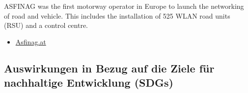 \documentclass[
]{book}
\providecommand{\tightlist}{%
  \setlength{\itemsep}{0pt}\setlength{\parskip}{0pt}}
\begin{document}
ASFINAG was the first motorway operator in Europe to launch the networking of road and vehicle. This includes the installation of 525 WLAN road units (RSU) and a control centre.

\begin{itemize}
\tightlist
\item
  \href{https://www.asfinag.at/ueber-uns/newsroom/pressemeldungen/2020/wlan-ausbau-cooperative-intelligent-transport-systems/}{Asfinag.at}
\end{itemize}

\hypertarget{auswirkungen-in-bezug-auf-die-ziele-fuxfcr-nachhaltige-entwicklung-sdgs-19}{%
\subsection*{Auswirkungen in Bezug auf die Ziele für nachhaltige Entwicklung (SDGs)}\label{auswirkungen-in-bezug-auf-die-ziele-fuxfcr-nachhaltige-entwicklung-sdgs-19}}
\end{document}
